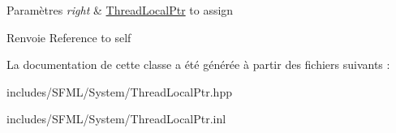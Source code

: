 \begin{DoxyParams}{Paramètres}
{\em right} & \hyperlink{classsf_1_1ThreadLocalPtr}{Thread\+Local\+Ptr} to assign\\
\hline
\end{DoxyParams}
\begin{DoxyReturn}{Renvoie}
Reference to self 
\end{DoxyReturn}


La documentation de cette classe a été générée à partir des fichiers suivants \+:\begin{DoxyCompactItemize}
\item 
includes/\+S\+F\+M\+L/\+System/Thread\+Local\+Ptr.\+hpp\item 
includes/\+S\+F\+M\+L/\+System/Thread\+Local\+Ptr.\+inl\end{DoxyCompactItemize}
